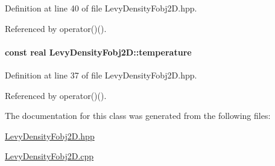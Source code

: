 \-Definition at line 40 of file \-Levy\-Density\-Fobj2\-D.\-hpp.



\-Referenced by operator()().

\hypertarget{classLevyDensityFobj2D_abef22d5930a586484e457df69f2c35f2}{
\paragraph[{temperature}]{\setlength{\rightskip}{0pt plus 5cm}const real {\bf \-Levy\-Density\-Fobj2\-D\-::temperature}}}\label{classLevyDensityFobj2D_abef22d5930a586484e457df69f2c35f2}


\-Definition at line 37 of file \-Levy\-Density\-Fobj2\-D.\-hpp.



\-Referenced by operator()().



\-The documentation for this class was generated from the following files\-:\begin{DoxyCompactItemize}
\item 
\hyperlink{LevyDensityFobj2D_8hpp}{\-Levy\-Density\-Fobj2\-D.\-hpp}\item 
\hyperlink{LevyDensityFobj2D_8cpp}{\-Levy\-Density\-Fobj2\-D.\-cpp}\end{DoxyCompactItemize}
